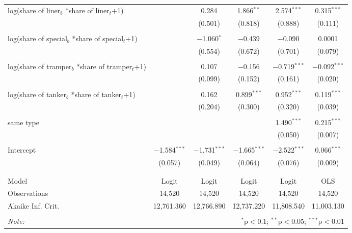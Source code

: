 \begin{tabular}{@{\extracolsep{5pt}}lccccc}
 log(share of liner$_{b}$ *share of liner$_{t}$+1) &  & 0.284 & 1.866$^{**}$ & 2.574$^{***}$ & 0.315$^{***}$ \\ 
  &  & (0.501) & (0.818) & (0.888) & (0.111) \\ 
  & & & & & \\ 
 log(share of special$_{b}$ *share of special$_{t}$+1) &  & $-$1.060$^{*}$ & $-$0.439 & $-$0.090 & 0.0001 \\ 
  &  & (0.554) & (0.672) & (0.701) & (0.079) \\ 
  & & & & & \\ 
 log(share of tramper$_{b}$ *share of tramper$_{t}$+1) &  & 0.107 & $-$0.156 & $-$0.719$^{***}$ & $-$0.092$^{***}$ \\ 
  &  & (0.099) & (0.152) & (0.161) & (0.020) \\ 
  & & & & & \\ 
 log(share of tanker$_{b}$ *share of tanker$_{t}$+1) &  & 0.162 & 0.899$^{***}$ & 0.952$^{***}$ & 0.119$^{***}$ \\ 
  &  & (0.204) & (0.300) & (0.320) & (0.039) \\ 
  & & & & & \\ 
 same type &  &  &  & 1.490$^{***}$ & 0.215$^{***}$ \\ 
  &  &  &  & (0.050) & (0.007) \\ 
  & & & & & \\ 
 Intercept & $-$1.584$^{***}$ & $-$1.731$^{***}$ & $-$1.665$^{***}$ & $-$2.522$^{***}$ & 0.066$^{***}$ \\ 
  & (0.057) & (0.049) & (0.064) & (0.076) & (0.009) \\ 
  & & & & & \\ 
\hline \\[-1.8ex] 
Model & Logit & Logit & Logit & Logit & OLS \\ 
Observations & 14,520 & 14,520 & 14,520 & 14,520 & 14,520 \\ 
Akaike Inf. Crit. & 12,761.360 & 12,766.890 & 12,737.220 & 11,808.540 & 11,003.130 \\ 
\hline 
\hline \\[-1.8ex] 
\textit{Note:}  & \multicolumn{5}{r}{$^{*}$p$<$0.1; $^{**}$p$<$0.05; $^{***}$p$<$0.01} \\ 
\end{tabular} 
